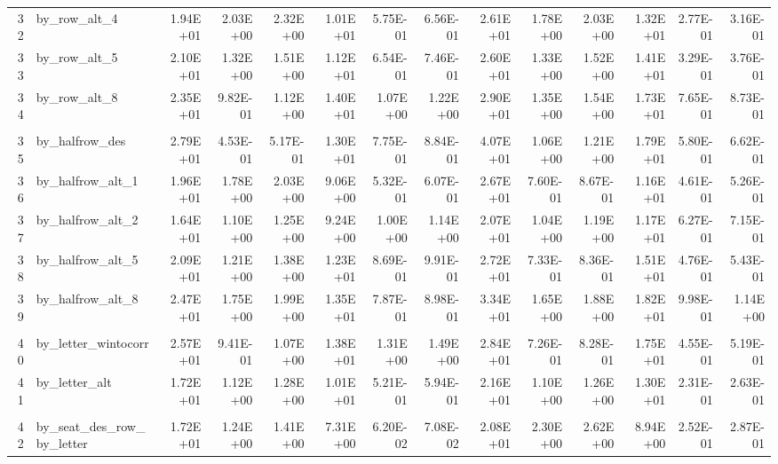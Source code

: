 \documentclass[11pt]{article}
\begin{document}
\begin{table}[htbp]
\begin{tabular}{rlrrrrrrrrrrrr}
    32    & by\_row\_alt\_4 & 1.94E+01 & 2.03E+00 & 2.32E+00 & 1.01E+01 & 5.75E-01 & 6.56E-01 & 2.61E+01 & 1.78E+00 & 2.03E+00 & 1.32E+01 & 2.77E-01 & 3.16E-01 \\
    33    & by\_row\_alt\_5 & 2.10E+01 & 1.32E+00 & 1.51E+00 & 1.12E+01 & 6.54E-01 & 7.46E-01 & 2.60E+01 & 1.33E+00 & 1.52E+00 & 1.41E+01 & 3.29E-01 & 3.76E-01 \\
    34    & by\_row\_alt\_8 & 2.35E+01 & 9.82E-01 & 1.12E+00 & 1.40E+01 & 1.07E+00 & 1.22E+00 & 2.90E+01 & 1.35E+00 & 1.54E+00 & 1.73E+01 & 7.65E-01 & 8.73E-01 \\
          &       &       &       &       &       &       &       &       &       &       &       &       &  \\
    35    & by\_halfrow\_des & 2.79E+01 & 4.53E-01 & 5.17E-01 & 1.30E+01 & 7.75E-01 & 8.84E-01 & 4.07E+01 & 1.06E+00 & 1.21E+00 & 1.79E+01 & 5.80E-01 & 6.62E-01 \\
    36    & by\_halfrow\_alt\_1 & 1.96E+01 & 1.78E+00 & 2.03E+00 & 9.06E+00 & 5.32E-01 & 6.07E-01 & 2.67E+01 & 7.60E-01 & 8.67E-01 & 1.16E+01 & 4.61E-01 & 5.26E-01 \\
    37    & by\_halfrow\_alt\_2 & 1.64E+01 & 1.10E+00 & 1.25E+00 & 9.24E+00 & 1.00E+00 & 1.14E+00 & 2.07E+01 & 1.04E+00 & 1.19E+00 & 1.17E+01 & 6.27E-01 & 7.15E-01 \\
    38    & by\_halfrow\_alt\_5 & 2.09E+01 & 1.21E+00 & 1.38E+00 & 1.23E+01 & 8.69E-01 & 9.91E-01 & 2.72E+01 & 7.33E-01 & 8.36E-01 & 1.51E+01 & 4.76E-01 & 5.43E-01 \\
    39    & by\_halfrow\_alt\_8 & 2.47E+01 & 1.75E+00 & 1.99E+00 & 1.35E+01 & 7.87E-01 & 8.98E-01 & 3.34E+01 & 1.65E+00 & 1.88E+00 & 1.82E+01 & 9.98E-01 & 1.14E+00 \\
          &       &       &       &       &       &       &       &       &       &       &       &       &  \\
    40    & by\_letter\_wintocorr & 2.57E+01 & 9.41E-01 & 1.07E+00 & 1.38E+01 & 1.31E+00 & 1.49E+00 & 2.84E+01 & 7.26E-01 & 8.28E-01 & 1.75E+01 & 4.55E-01 & 5.19E-01 \\
    41    & by\_letter\_alt & 1.72E+01 & 1.12E+00 & 1.28E+00 & 1.01E+01 & 5.21E-01 & 5.94E-01 & 2.16E+01 & 1.10E+00 & 1.26E+00 & 1.30E+01 & 2.31E-01 & 2.63E-01 \\
          &       &       &       &       &       &       &       &       &       &       &       &       &  \\
    42    & by\_seat\_des\_row\_by\_letter & 1.72E+01 & 1.24E+00 & 1.41E+00 & 7.31E+00 & 6.20E-02 & 7.08E-02 & 2.08E+01 & 2.30E+00 & 2.62E+00 & 8.94E+00 & 2.52E-01 & 2.87E-01 \\

\end{tabular}
\end{table}
\end{document}
